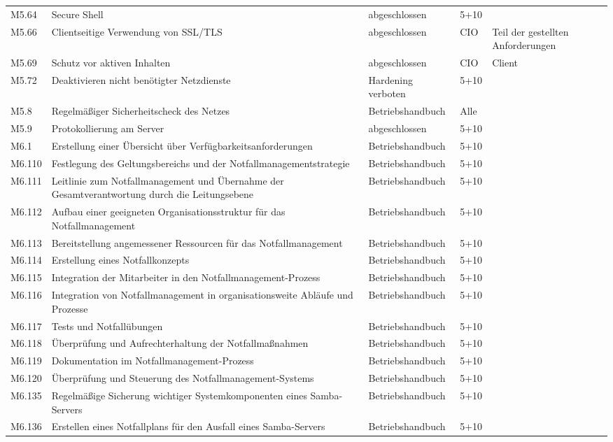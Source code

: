 \begin{longtable}{lp{3.7cm}p{3cm}lp{3.8cm}}
M5.64 & Secure Shell & abgeschlossen & 5+10 &  \\
M5.66 & Clientseitige Verwendung von SSL/TLS & abgeschlossen & CIO & Teil der gestellten Anforderungen \\
M5.69 & Schutz vor aktiven Inhalten & abgeschlossen & CIO & Client \\
M5.72 & Deaktivieren nicht benötigter Netzdienste & Hardening verboten & 5+10 &  \\
M5.8 & Regelmäßiger Sicherheitscheck des Netzes & Betriebshandbuch & Alle &  \\
M5.9 & Protokollierung am Server & abgeschlossen & 5+10 &  \\
M6.1 & Erstellung einer Übersicht über Verfügbarkeitsanforderungen & Betriebshandbuch & 5+10 &  \\
M6.110 & Festlegung des Geltungsbereichs und der Notfallmanagementstrategie & Betriebshandbuch & 5+10 &  \\
M6.111 & Leitlinie zum Notfallmanagement und Übernahme der Gesamtverantwortung durch die Leitungsebene & Betriebshandbuch & 5+10 &  \\
M6.112 & Aufbau einer geeigneten Organisationsstruktur für das Notfallmanagement & Betriebshandbuch & 5+10 &  \\
M6.113 & Bereitstellung angemessener Ressourcen für das Notfallmanagement & Betriebshandbuch & 5+10 &  \\
M6.114 & Erstellung eines Notfallkonzepts & Betriebshandbuch & 5+10 &  \\
M6.115 & Integration der Mitarbeiter in den Notfallmanagement-Prozess & Betriebshandbuch & 5+10 &  \\
M6.116 & Integration von Notfallmanagement in organisationsweite Abläufe und Prozesse & Betriebshandbuch & 5+10 &  \\
M6.117 & Tests und Notfallübungen & Betriebshandbuch & 5+10 &  \\
M6.118 & Überprüfung und Aufrechterhaltung der Notfallmaßnahmen & Betriebshandbuch & 5+10 &  \\
M6.119 & Dokumentation im Notfallmanagement-Prozess & Betriebshandbuch & 5+10 &  \\
M6.120 & Überprüfung und Steuerung des Notfallmanagement-Systems & Betriebshandbuch & 5+10 &  \\
M6.135 & Regelmäßige Sicherung wichtiger Systemkomponenten eines Samba-Servers & Betriebshandbuch & 5+10 &  \\
M6.136 &  Erstellen eines Notfallplans für den Ausfall eines Samba-Servers & Betriebshandbuch & 5+10 &  \\

\end{longtable}
